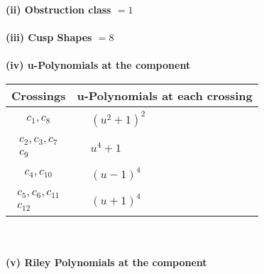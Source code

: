 \documentclass[1p]{elsarticle_modified}
\theoremstyle{definition}
\begin{document}
\flushleft \textbf{(ii) Obstruction class $= 1$}\\~\\
\flushleft \textbf{(iii) Cusp Shapes $= 8$}\\~\\
\newpage\renewcommand{\arraystretch}{1}
\flushleft \textbf{(iv) u-Polynomials at the component}\newline \\
\begin{tabular}{m{50pt}|m{274pt}}
Crossings & \hspace{64pt}u-Polynomials at each crossing \\
\hline $$\begin{aligned}c_{1},c_{8}\end{aligned}$$&$\begin{aligned}
&(u^2+1)^2
\end{aligned}$\\
\hline $$\begin{aligned}c_{2},c_{3},c_{7}\\c_{9}\end{aligned}$$&$\begin{aligned}
&u^4+1
\end{aligned}$\\
\hline $$\begin{aligned}c_{4},c_{10}\end{aligned}$$&$\begin{aligned}
&(u-1)^4
\end{aligned}$\\
\hline $$\begin{aligned}c_{5},c_{6},c_{11}\\c_{12}\end{aligned}$$&$\begin{aligned}
&(u+1)^4
\end{aligned}$\\
\hline
\end{tabular}\\~\\
\newpage\renewcommand{\arraystretch}{1}
\flushleft \textbf{(v) Riley Polynomials at the component}\newline \\
\end{document}
